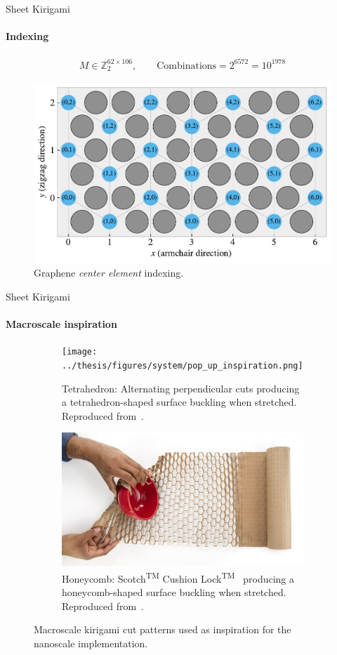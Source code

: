 \documentclass[
	10pt, %
]{beamer}
\begin{document}
%
%
\begin{frame}{Sheet Kirigami}
	\framesubtitle{Indexing}
	\begin{align*}
		M \in \mathbb{Z}_2^{62 \times 106}, \qquad \text{Combinations} = 2^{6572} = 10^{1978}
	\end{align*}
	\begin{figure}[H]
		\centering
		\includegraphics[width=0.7\linewidth]{../thesis/figures/system/center_indexing.pdf}
		\caption{Graphene \textit{center element} indexing.}
	\end{figure}	
\end{frame}
%
%
\begin{frame}{Sheet Kirigami}
	\framesubtitle{Macroscale inspiration}
	\vspace*{5mm}
	\begin{figure}[H]
		\centering
		\begin{subfigure}[t]{0.48\textwidth}
			\centering
			\texttt{[image: ../thesis/figures/system/pop\_up\_inspiration.png]}
			\caption{Tetrahedron: Alternating perpendicular cuts producing a tetrahedron-shaped surface buckling when stretched. Reproduced from~\cite{new_pop_up}. }
		\end{subfigure}
		\hfill
		\begin{subfigure}[t]{0.48\textwidth}
			\centering
			\includegraphics[width=\textwidth]{../thesis/figures/system/honeycomb_inspiration.jpg}
			\caption{Honeycomb: Scotch\textsuperscript{TM} Cushion Lock\textsuperscript{TM}~\cite{cushion_wrap} producing a honeycomb-shaped surface buckling when stretched. Reproduced from~\cite{cushion_wrap}.}
		\end{subfigure}
		\hfill
		\caption{Macroscale kirigami cut patterns used as inspiration for the nanoscale implementation.}
	  \end{figure}
\end{frame}
\end{document}
